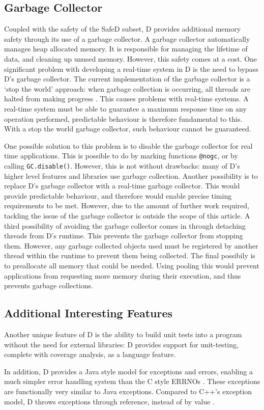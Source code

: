 \subsection{Garbage Collector}
Coupled with the safety of the SafeD subset, D provides additional memory
safety through its use of a garbage collector. A garbage collector
automatically manages heap allocated memory. It is responsible for managing
the lifetime of data, and cleaning up unused memory. 
However, this safety comes at a cost. One significant problem with developing a 
real-time system in D is the need to bypass D's garbage collector. 
The current implementation of the garbage 
collector is a `stop the world' approach: when garbage collection is occurring, 
all threads are halted from making progress 
\cite{dlang-garbage}. This causes problems with 
real-time systems. A real-time system must be able to guarantee a maximum response 
time on any operation performed, predictable behaviour is therefore fundamental to this. 
With a stop the world garbage collector, such behaviour cannot be guaranteed. 
\par\bigskip\noindent
One possible solution to this problem is to disable the garbage collector for 
real time applications. This is possible to do by marking functions \texttt{@nogc}, 
or by calling \texttt{GC.disable()}. However, this is not without drawbacks: 
many of D's higher level features and libraries use garbage collection. 
Another possibility is to replace D's garbage collector with a real-time 
garbage collector. This would provide predictable behaviour, and therefore
would enable precise timing requirements to be met.
However, due to the amount of further work required, tackling the issue of the garbage 
collector is outside the scope of this article.
A third possibility of avoiding the garbage collector comes in through
detaching threads from D's runtime. This prevents the garbage collector from
stopping them. However, any garbage collected objects used must be registered
by another thread within the runtime to prevent them being collected. 
The final possibily is to preallocate all memory that could be needed. Using
pooling this would prevent applications from requesting more memory during
their execution, and thus prevents garbage collections. 

\subsection{Additional Interesting Features}
Another unique feature of D is the ability to build unit tests into a 
program without the need for external libraries: D provides support for 
unit-testing, complete with coverage analysis, as a language feature. 
\par\bigskip\noindent
In addition, D provides a Java style model for exceptions and errors, enabling 
a much simpler error handling system than the C style ERRNOs 
\cite{ddili-book}. 
These exceptions are functionally very similar to Java exceptions. Compared to
C++'s exception model, D throws exceptions through reference, instead of by
value \cite{interface-to-cpp}. 


